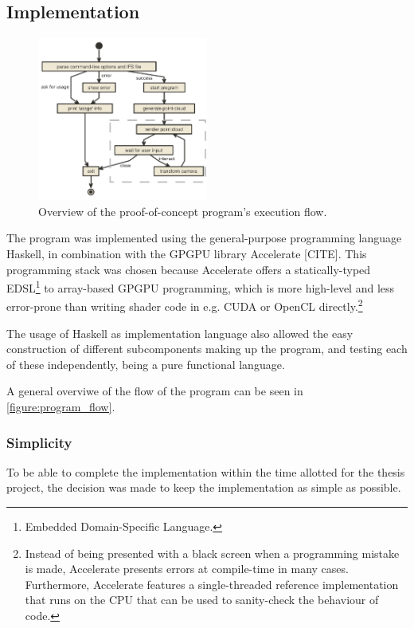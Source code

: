 \documentclass[11pt]{article}
\begin{document}
\subsection{Implementation}
\label{sec:org3b8a51b}

\begin{figure}
  \centering
  \includegraphics[width=0.5\textwidth]{figures/program_execution}
  \caption{Overview of the proof-of-concept program's execution flow.}
\label{figure:program_flow}
\end{figure}

The program was implemented using the general-purpose programming language Haskell, 
in combination with the GPGPU library Accelerate [CITE].
This programming stack was chosen because Accelerate 
offers a statically-typed EDSL\footnote{Embedded Domain-Specific Language.} to array-based GPGPU programming,
which is more high-level and less error-prone than writing shader code in e.g. CUDA or OpenCL directly.\footnote{Instead of being presented with a black screen when a programming mistake is made, 
Accelerate presents errors at compile-time in many cases. Furthermore, Accelerate features a
single-threaded reference implementation that runs on the CPU that can be used to sanity-check the behaviour of code.}

The usage of Haskell as implementation language also allowed 
the easy construction of different subcomponents making up the program,
and testing each of these independently, being a pure functional language.

A general overviwe of the flow of the program can be seen in \autoref{figure:program_flow}.

\subsubsection{Simplicity}
\label{sec:orgd08fab0}

To be able to complete the implementation within the time allotted for the thesis project,
the decision was made to keep the implementation as simple as possible.
\end{document}
